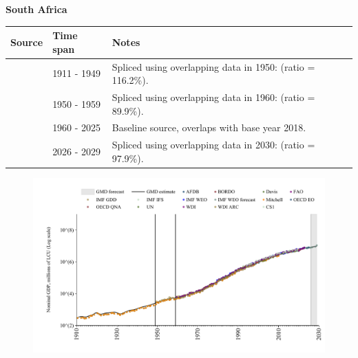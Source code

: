\documentclass[12pt,a4paper,landscape]{article}
\begin{document}
\begin{adjustbox}{max totalsize={\paperwidth}{\paperheight},center}
\begin{minipage}[t][\textheight][t]{\textwidth}
\vspace*{0.5cm}
{}
\begin{center}
{\Large\bfseries South Africa}
\end{center}
\vspace{0.5cm}
\begin{table}[H]
\centering
\small
\begin{tabular}{|l|l|l|}
\hline
\textbf{Source} & \textbf{Time span} & \textbf{Notes} \\
\hline
\rowcolor{white}\cite{Mitchell}& 1911 - 1949 &Spliced using overlapping data in 1950: (ratio = 116.2\%).\\
\rowcolor{lightgray}\cite{IMF_GDD}& 1950 - 1959 &Spliced using overlapping data in 1960: (ratio = 89.9\%).\\
\rowcolor{white}\cite{OECD_EO}& 1960 - 2025 &Baseline source, overlaps with base year 2018.\\
\rowcolor{lightgray}\cite{IMF_WEO_forecast}& 2026 - 2029 &Spliced using overlapping data in 2030: (ratio = 97.9\%).\\
\hline
\end{tabular}
\end{table}
\begin{figure}[H]
\centering
\includegraphics[width=\textwidth,height=0.6\textheight,keepaspectratio]{graphs/ZAF_nGDP.pdf}
\end{figure}
\end{minipage}
\end{adjustbox}
\end{document}

